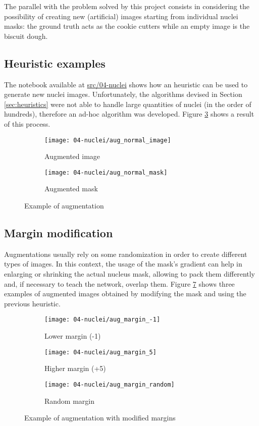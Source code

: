 The parallel with the problem solved by this project consists in considering the possibility of creating new (artificial) images starting from individual nuclei masks: the ground truth acts as the cookie cutters while an empty image is the biscuit dough.

\subsection{Heuristic examples}
The notebook available at \href{https://github.com/rb-sl/biscuit_optimizer/blob/main/src/04-nuclei}{src/04-nuclei} shows how an heuristic can be used to generate new nuclei images. Unfortunately, the algorithms devised in Section \ref{sec:heuristics} were not able to handle large quantities of nuclei (in the order of hundreds), therefore an ad-hoc algorithm was developed. Figure \ref{fig:aug_normal} shows a result of this process.
\begin{figure}[H]
	\centering
	\begin{subfigure}[b]{.4\textwidth}
		\centering
		\texttt{[image: 04-nuclei/aug\_normal\_image]}
		\caption{Augmented image}
		\label{fig:aug_image}
	\end{subfigure}
	\begin{subfigure}[b]{.4\textwidth}
		\centering
		\texttt{[image: 04-nuclei/aug\_normal\_mask]}
		\caption{Augmented mask}
		\label{fig:aug_mask}
	\end{subfigure} 
	\caption{Example of augmentation}
	\label{fig:aug_normal}
\end{figure}

\subsection{Margin modification}
Augmentations usually rely on some randomization in order to create different types of images. In this context, the usage of the mask's gradient can help in enlarging or shrinking the actual nucleus mask, allowing to pack them differently and, if necessary to teach the network, overlap them. Figure \ref{fig:aug_margin} shows three examples of augmented images obtained by modifying the mask and using the previous heuristic.
\begin{figure}[H]
	\centering
	\begin{subfigure}[b]{.3\textwidth}
		\centering
		\texttt{[image: 04-nuclei/aug\_margin\_-1]}
		\caption{Lower margin (-1)}
		\label{fig:lower_margin}
	\end{subfigure}
	\begin{subfigure}[b]{.3\textwidth}
		\centering
		\texttt{[image: 04-nuclei/aug\_margin\_5]}
		\caption{Higher margin (+5)}
		\label{fig:higher_margin}
	\end{subfigure} 
	\begin{subfigure}[b]{.3\textwidth}
		\centering
		\texttt{[image: 04-nuclei/aug\_margin\_random]}
		\caption{Random margin}
		\label{fig:random_margin}
	\end{subfigure} 
	\caption{Example of augmentation with modified margins} 
	\label{fig:aug_margin}
\end{figure}
